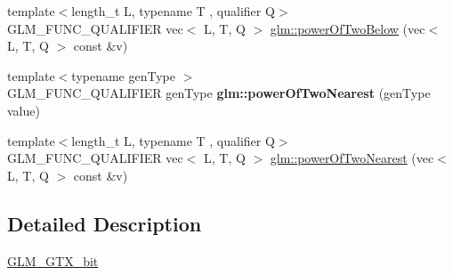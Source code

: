 \begin{DoxyCompactItemize}
\item 
{\footnotesize template$<$length\+\_\+t L, typename T , qualifier Q$>$ }\\G\+L\+M\+\_\+\+F\+U\+N\+C\+\_\+\+Q\+U\+A\+L\+I\+F\+I\+ER vec$<$ L, T, Q $>$ \hyperlink{group__gtx__bit_gaf78ddcc4152c051b2a21e68fecb10980}{glm\+::power\+Of\+Two\+Below} (vec$<$ L, T, Q $>$ const \&v)
\item 
\mbox{\label{bit_8inl_a90d716367872062cffce4a8cd51acd0c}} 
{\footnotesize template$<$typename gen\+Type $>$ }\\G\+L\+M\+\_\+\+F\+U\+N\+C\+\_\+\+Q\+U\+A\+L\+I\+F\+I\+ER gen\+Type {\bfseries glm\+::power\+Of\+Two\+Nearest} (gen\+Type value)
\item 
{\footnotesize template$<$length\+\_\+t L, typename T , qualifier Q$>$ }\\G\+L\+M\+\_\+\+F\+U\+N\+C\+\_\+\+Q\+U\+A\+L\+I\+F\+I\+ER vec$<$ L, T, Q $>$ \hyperlink{group__gtx__bit_gac87e65d11e16c3d6b91c3bcfaef7da0b}{glm\+::power\+Of\+Two\+Nearest} (vec$<$ L, T, Q $>$ const \&v)
\end{DoxyCompactItemize}


\subsection{Detailed Description}
\hyperlink{group__gtx__bit}{G\+L\+M\+\_\+\+G\+T\+X\+\_\+bit} 